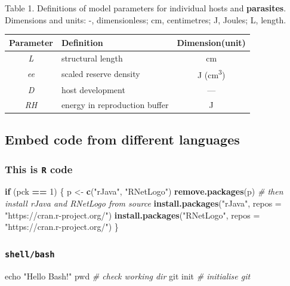 \documentclass[10,portrait]{article}
\newenvironment{Shaded}{\begin{snugshade}}{\end{snugshade}}
\newcommand{\KeywordTok}[1]{\textcolor[rgb]{0.13,0.29,0.53}{\textbf{#1}}}
\newcommand{\DataTypeTok}[1]{\textcolor[rgb]{0.13,0.29,0.53}{#1}}
\newcommand{\DecValTok}[1]{\textcolor[rgb]{0.00,0.00,0.81}{#1}}
\newcommand{\StringTok}[1]{\textcolor[rgb]{0.31,0.60,0.02}{#1}}
\newcommand{\CommentTok}[1]{\textcolor[rgb]{0.56,0.35,0.01}{\textit{#1}}}
\newcommand{\FunctionTok}[1]{\textcolor[rgb]{0.00,0.00,0.00}{#1}}
\newcommand{\ControlFlowTok}[1]{\textcolor[rgb]{0.13,0.29,0.53}{\textbf{#1}}}
\newcommand{\OperatorTok}[1]{\textcolor[rgb]{0.81,0.36,0.00}{\textbf{#1}}}
\newcommand{\BuiltInTok}[1]{#1}
\newcommand{\NormalTok}[1]{#1}
\begin{document}
Table 1. Definitions of model parameters for individual hosts and
\textbf{parasites}. Dimensions and units: -, dimensionless; cm,
centimetres; J, Joules; L, length.

\begin{longtable}[]{@{}clc@{}}
\toprule
Parameter & Definition & Dimension(unit)\tabularnewline
\midrule
\endhead
\emph{L} & structural length & cm\tabularnewline
\emph{ee} & scaled reserve density & J
(cm\textsuperscript{3})\tabularnewline
\emph{D} & host development & ---\tabularnewline
\emph{RH} & energy in reproduction buffer & J\tabularnewline
\bottomrule
\end{longtable}

\newpage  

\subsection{Embed code from different
languages}\label{embed-code-from-different-languages}

\subsubsection{\texorpdfstring{This is \texttt{R}
code}{This is R code}}\label{this-is-r-code}

\begin{Shaded}
\begin{Highlighting}[]
\ControlFlowTok{if}\NormalTok{ (pck }\OperatorTok{==}\StringTok{ }\DecValTok{1}\NormalTok{) \{}
\NormalTok{    p <-}\StringTok{ }\KeywordTok{c}\NormalTok{(}\StringTok{"rJava"}\NormalTok{, }\StringTok{"RNetLogo"}\NormalTok{)}
    \KeywordTok{remove.packages}\NormalTok{(p)}
    \CommentTok{# then install rJava and RNetLogo from source}
    \KeywordTok{install.packages}\NormalTok{(}\StringTok{"rJava"}\NormalTok{, }\DataTypeTok{repos =} \StringTok{"https://cran.r-project.org/"}\NormalTok{)}
    \KeywordTok{install.packages}\NormalTok{(}\StringTok{"RNetLogo"}\NormalTok{, }\DataTypeTok{repos =} \StringTok{"https://cran.r-project.org/"}\NormalTok{)}
\NormalTok{\}}
\end{Highlighting}
\end{Shaded}

\subsubsection{\texorpdfstring{\texttt{shell/bash}}{shell/bash}}\label{shellbash}

\begin{Shaded}
\begin{Highlighting}[]
\BuiltInTok{echo} \StringTok{"Hello Bash!"}  
\BuiltInTok{pwd} \CommentTok{# check working dir}
\FunctionTok{git}\NormalTok{ init }\CommentTok{# initialise git}
\end{Highlighting}
\end{Shaded}
\end{document}

